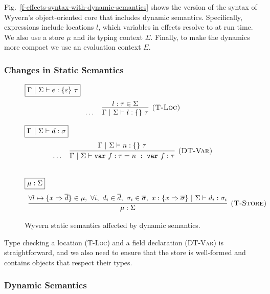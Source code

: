 Fig.~\ref{f-effects-syntax-with-dynamic-semantics} shows the version of the syntax of Wyvern's object-oriented core that includes dynamic semantics. Specifically, expressions include locations $l$, which variables in effects resolve to at run time. We also use a store $\mu$ and its typing context $\Sigma$. Finally, to make the dynamics more compact we use an evaluation context $E$.


\subsubsection{Changes in Static Semantics}
\label{app-static-semantics-extra}

\begin{figure}[!t]
\flushleft
\footnotesize{
$\fbox{$\Gamma~|~\Sigma \vdash e : \{ \varepsilon \}~\tau$}$
\[
\begin{array}{c}
\ldots
\hspace{10pt}
\infer[\textsc{(T-Loc)}]
  {\Gamma~|~\Sigma \vdash l : \{ \}~\tau}
  {l : \tau \in \Sigma}
\end{array}
\]

\noindent$\fbox{$\Gamma~|~\Sigma \vdash d : \sigma$}$
\[
\begin{array}{c}
\ldots
\hspace{10pt}
\infer[\textsc{(DT-Var)}]
  {\Gamma~|~\Sigma \vdash \keyw{var} f : \tau = n~:~\keyw{var} f : \tau}
  {\Gamma~|~\Sigma \vdash n : \{ \}~\tau}\\[3ex]
\end{array}
\]

$\fbox{$\mu : \Sigma$}$
\[
\begin{array}{c}
\infer[\textsc{(T-Store)}]
  {\mu : \Sigma}
  {\forall l \mapsto \{ x \Rightarrow \overline{d} \} \in \mu,~\forall i,~d_i \in \overline{d},~\sigma_i \in \overline{\sigma},~x : \{ x \Rightarrow \overline{\sigma} \}~|~\Sigma \vdash d_i : \sigma_i}
\end{array}
\]
}
\caption{Wyvern static semantics affected by dynamic semantics.}
\label{f-effects-static-semantics-extra}
\end{figure}

Type checking a location (\textsc{T-Loc}) and a field declaration (\textsc{DT-Var}) is straightforward, and we also need to ensure that the store is well-formed and contains objects that respect their types.


\subsubsection{Dynamic Semantics}

